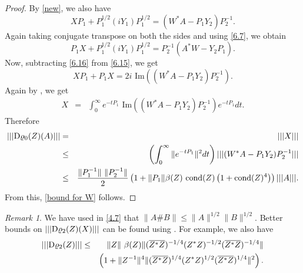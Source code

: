 \documentclass[12pt,epsfig,reqno]{amsart}
\newcommand{\De}{{\rm D}}
\theoremstyle{remark}
\newtheorem{remark}[thm]{Remark}
\begin{document}
\begin{proof}
By \eqref{new}, we also have
\begin{equation}
XP_1+P_1^{1/2} (i Y_1) P_1^{1/2}=(W^*A-P_1 Y_2) P_2^{-1}.\label{6.15}
\end{equation}
Again taking conjugate transpose on both the sides and using \eqref{6.7}, we obtain
\begin{equation}
P_1 X+P_1^{1/2} (i Y_1) P_1^{1/2}=P_2^{-1} (A^*W-Y_2 P_1).\label{6.16}
\end{equation}
Now, subtracting  \eqref{6.16} from \eqref{6.15}, we get
$$X P_1+P_1 X=2i \text{ Im}\left((W^*A-P_1 Y_2) P_2^{-1}\right) .$$
Again by \cite[Theorem VII.2.3]{bhatia_matrix_analysis}, we get \begin{eqnarray*}
X&=& \int_0^{\infty} e^{-t P_1} \text{ Im}\left((W^*A-P_1 Y_2) P_2^{-1}\right) e^{-t P_1} dt.
\end{eqnarray*}
Therefore \begin{eqnarray*}
|||\De\varrho_0(Z)(A)|||&=&||| X|||\\
&\leq&  \left(\int_0^{\infty}  \|e^{-t P_1}\|^2 dt\right) |||(W^*A-P_1 Y_2) P_2^{-1}|||\\
&\leq & \frac{\|P_1^{-1}\| \ \|P_2^{-1}\|}{2 } \left( 1+ \|P_1\|  \beta(Z)\
\text{\rm cond} (Z)  \left(1+\text{\rm cond}(Z)^4\right)\right) |||A|||.
\end{eqnarray*}
From this, \eqref{bound for W} follows.

\end{proof}
\begin{remark}
We have used in \eqref{4.7} that $\|A\# B\|\leq \|A\|^{1/2} \|B\|^{1/2}$.
Better bounds on $|||\De \varrho_2(Z)(X)|||$ can be found using \cite[Theorem 2]{bhatia_grover}. For example, we also have
\begin{eqnarray*}
|||\De \varrho_2(Z)|||&\leq& \|Z\|\ \beta (Z) \|(\overline{Z^*Z})^{-1/4}(Z^*Z)^{-1/2}(\overline{Z^*Z})^{-1/4}\|\\
&&\left(1+\|Z^{-1}\|^4 \|(\overline{Z^*Z})^{1/4}(Z^*Z)^{1/2}(\overline{Z^*Z})^{1/4}\|^2\right).
\end{eqnarray*}
\end{remark}
\end{document}
